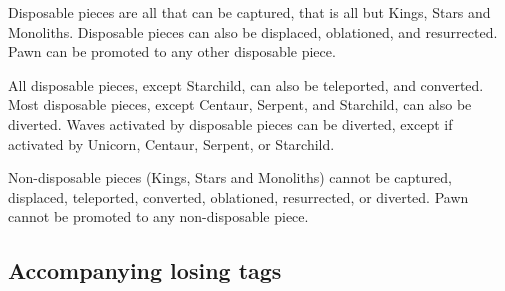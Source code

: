 Disposable pieces are all that can be captured, that is all but Kings, Stars and
Monoliths. Disposable pieces can also be displaced, oblationed, and resurrected.
Pawn can be promoted to any other disposable piece.

All disposable pieces, except Starchild, can also be teleported, and converted.
Most disposable pieces, except Centaur, Serpent, and Starchild, can also be
diverted. Waves activated by disposable pieces can be diverted, except if
activated by Unicorn, Centaur, Serpent, or Starchild.

Non-disposable pieces (Kings, Stars and Monoliths) cannot be captured, displaced,
teleported, converted, oblationed, resurrected, or diverted. Pawn cannot be
promoted to any non-disposable piece.


\clearpage %

\subsection*{Accompanying losing tags}
\label{sec:Appendix/Summary/Accompanying-losing-tags}

